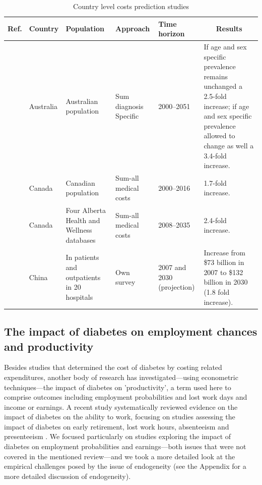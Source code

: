 \begin{table}[p]
\begin{tabularx}{\linewidth}{m m m m m b}
\caption{Country level costs prediction studies}\label{tab:review_prediction}\\
\toprule
Ref. & Country & Population   & Approach & Time  horizon & \multicolumn{1}{c}{Results}                                                                                                                                            \\ \midrule
\textcite{Davis2006b}  & Australia & Australian   population                       & Sum diagnosis  Specific & 2000--2051                                                              & If age and sex specific prevalence remains unchanged a 2.5-fold increase; if age and sex specific prevalence allowed to change as well a 3.4-fold increase. \\
\textcite{Ohinmaa2004}  & Canada    & Canadian   population                         & Sum-all   medical costs  & 2000--2016                                                              & 1.7-fold increase.                                                                                                                                          \\
\textcite{Lau2011a}  & Canada    & Four   Alberta Health and Wellness databases  & Sum-all  medical costs  & 2008--2035                                                              & 2.4-fold increase.                                                                                                                                          \\
\textcite{Wang2009f}  & China     & In   patients and outpatients in 20 hospitals & Own   survey             & 2007 and  2030 (projection) & Increase from \$73 billion in 2007 to \$132 billion in 2030 (1.8 fold increase).                                       \\ \bottomrule
\end{tabularx}
\end{table}

\subsection{The impact of diabetes on employment chances and productivity}
Besides studies that determined the cost of diabetes by costing related expenditures, another body of research has investigated---using econometric techniques---the impact of diabetes on 'productivity', a term used here to comprise outcomes including employment probabilities and lost work days and income or earnings. A recent study systematically reviewed evidence on the impact of diabetes on the ability to work, focusing on studies assessing the impact of diabetes on early retirement, lost work hours, absenteeism and presenteeism \parencite{Breton2013}. We focused particularly on studies exploring the impact of diabetes on employment probabilities and earnings---both issues that were not covered in the mentioned review---and we took a more detailed look at the empirical challenges posed by the issue of endogeneity (see the Appendix for a more detailed discussion of endogeneity).

